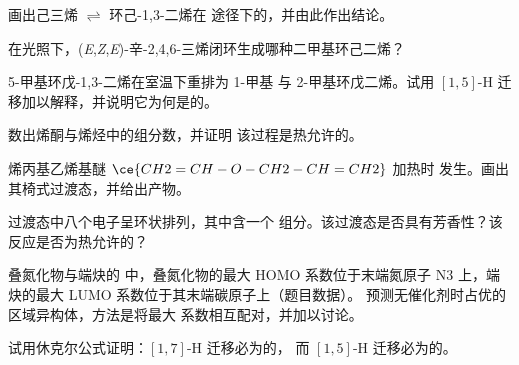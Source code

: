 \begin{exercise}[$\star\star$]\label{exo:b3:pericyclic:5}
画出己三烯 $\rightleftharpoons$ 环己-1,3-二烯在
途径下的，并由此作出结论。
\end{exercise}

\begin{exercise}[$\star\star$]\label{exo:b3:pericyclic:6}
在光照下，(\textit{E},\textit{Z},\textit{E})-辛-2,4,6-三烯闭环生成哪种二甲基环己二烯？
\end{exercise}

\begin{exercise}[$\star\star$]\label{exo:b3:pericyclic:7}
5-甲基环戊-1,3-二烯在室温下重排为 1-甲基
与 2-甲基环戊二烯。试用 $[1,5]$-H 迁移加以解释，并说明它为何是的。
\end{exercise}

\begin{exercise}[$\star\star$]\label{exo:b3:pericyclic:8}
数出烯酮与烯烃中的组分数，并证明
该过程是热允许的。
\end{exercise}

\begin{exercise}[$\star\star$]\label{exo:b3:pericyclic:9}
烯丙基乙烯基醚 $\ce{CH2=CH-O-CH2-CH=CH2}$ 加热时
发生。画出其椅式过渡态，并给出产物。
\end{exercise}

\begin{exercise}[$\star\star\star$]\label{exo:b3:pericyclic:10}
过渡态中八个电子呈环状排列，其中含一个
组分。该过渡态是否具有芳香性？该反应是否为热允许的？
\end{exercise}

\begin{exercise}[$\star\star\star$]\label{exo:b3:pericyclic:11}
叠氮化物与端炔的 中，叠氮化物的最大
HOMO 系数位于末端氮原子 N3 上，端炔的最大
LUMO 系数位于其末端碳原子上（题目数据）。
预测无催化剂时占优的区域异构体，方法是将最大
系数相互配对，并加以讨论。
\end{exercise}

\begin{exercise}[$\star\star\star$]\label{exo:b3:pericyclic:12}
试用休克尔公式证明：$[1,7]$-H 迁移必为的，
而 $[1,5]$-H 迁移必为的。
\end{exercise}

